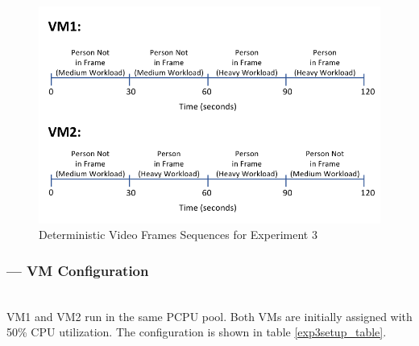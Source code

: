 \begin{figure}[h!]
\centering
\includegraphics[width=1\linewidth]{images/exp3seq}
\caption{Deterministic Video Frames Sequences for Experiment 3}
\label{exp3seq}
\end{figure}



\subsubsection*{--- VM Configuration}\hfill\\
\indent VM1 and VM2 run in the same PCPU pool. Both VMs are initially assigned with 50\% CPU utilization. The configuration is shown in table \ref{exp3setup_table}.





